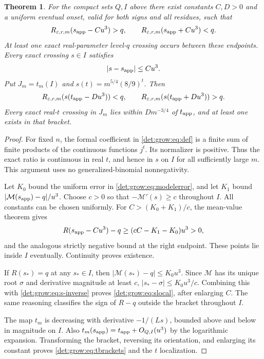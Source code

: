 \documentclass[11pt,letterpaper]{article}
\numberwithin{equation}{section}
\newtheorem{theorem}{Theorem}[section]
\theoremstyle{definition}\newtheorem{definition}[theorem]{Definition}
\theoremstyle{remark}\newtheorem{remark}[theorem]{Remark}
\newcommand{\eps}{\varepsilon}
\newcommand{\M}{\mathcal M}
\begin{document}
\begin{theorem}\label{det:grow:thm:brackets}
For the compact sets $Q,I$ above there exist constants $C,D>0$ and a
uniform eventual onset, valid for both signs and all residues, such that
\begin{equation}\label{det:grow:eq:sbrackets}
 R_{\eps,r,m}(s_{\rm app}-Cu^3)>q,\qquad
 R_{\eps,r,m}(s_{\rm app}+Cu^3)<q.
\end{equation}
At least one exact real-parameter level-$q$ crossing occurs between
these endpoints. Every exact crossing $s\in I$ satisfies
\begin{equation}\label{det:grow:eq:slocal}
 |s-s_{\rm app}|\le Cu^3.
\end{equation}
Put $J_m=t_m(I)$ and $s(t)=m^{5/4}(8/9)^t$. Then
\begin{equation}\label{det:grow:eq:tbrackets}
 R_{\eps,r,m}(s(t_{\rm app}-Du^3))<q,\qquad
 R_{\eps,r,m}(s(t_{\rm app}+Du^3))>q.
\end{equation}
Every exact real-$t$ crossing in $J_m$ lies within $D m^{-3/4}$ of
$t_{\rm app}$, and at least one exists in that bracket.
\end{theorem}
\begin{proof}
For fixed $n$, the formal coefficient in \eqref{det:grow:eq:def} is a finite
sum of finite products of the continuous functions $j^t$. Its
normalizer is positive. Thus the exact ratio is continuous in real
$t$, and hence in $s$ on $I$ for all sufficiently large $m$.
This argument uses no generalized-binomial nonnegativity.

Let $K_0$ bound the uniform error in \eqref{det:grow:eq:modelerror}, and let
$K_1$ bound $|\M(s_{\rm app})-q|/u^3$. Choose $c>0$ so that
$-\M'(s)\ge c$ throughout $I$. All constants can be chosen uniformly.
For $C>(K_0+K_1)/c$, the mean-value theorem gives
\[
 R(s_{\rm app}-Cu^3)-q\ge(cC-K_1-K_0)u^3>0,
\]
and the analogous strictly negative bound at the right endpoint.
These points lie inside $I$ eventually. Continuity proves existence.

If $R(s_*)=q$ at any $s_*\in I$, then
$|\M(s_*)-q|\le K_0u^3$. Since $\M$ has its unique root $\sigma$
and derivative magnitude at least $c$,
$|s_* -\sigma|\le K_0u^3/c$. Combining this with
\eqref{det:grow:eq:s-inverse} proves \eqref{det:grow:eq:slocal}, after enlarging $C$.
The same reasoning classifies the sign of $R-q$ outside the bracket
throughout $I$.

The map $t_m$ is decreasing with derivative $-1/(Ls)$, bounded above
and below in magnitude on $I$. Also
$t_m(s_{\rm app})=t_{\rm app}+O_{Q,I}(u^3)$ by the logarithmic expansion.
Transforming the bracket, reversing its orientation, and enlarging its
constant proves \eqref{det:grow:eq:tbrackets} and the $t$ localization.
\end{proof}
\end{document}
